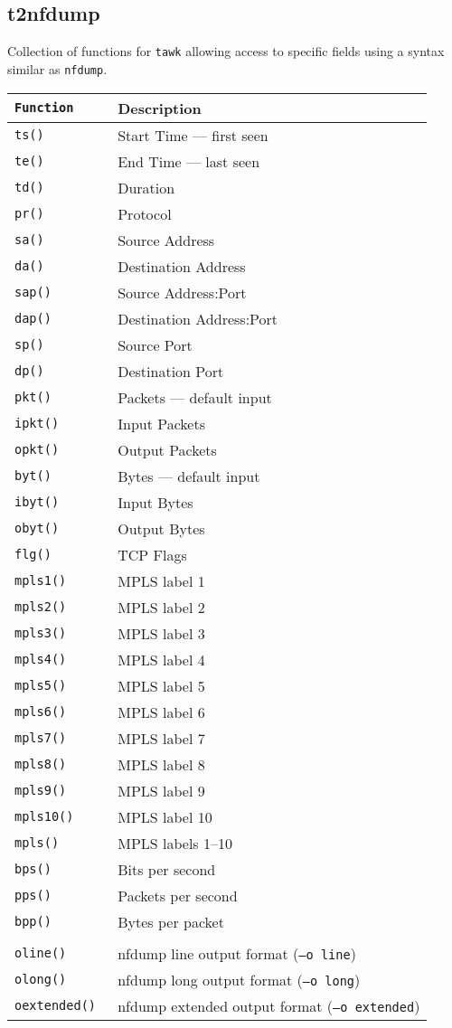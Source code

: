 \documentclass[documentation]{subfiles}
\begin{document}
\subsection{t2nfdump}\label{t2nfdump}
Collection of functions for {\tt tawk} allowing access to specific fields using a syntax similar as {\tt nfdump}.
\begin{longtable}{>{\tt}ll}
    \toprule
    {\bf Function} & {\bf Description}\\
    \midrule\endhead%
    ts()        & Start Time --- first seen\\
    te()        & End Time --- last seen\\
    td()        & Duration\\
    pr()        & Protocol\\
    sa()        & Source Address\\
    da()        & Destination Address\\
    sap()       & Source Address:Port\\
    dap()       & Destination Address:Port\\
    sp()        & Source Port\\
    dp()        & Destination Port\\
    pkt()       & Packets --- default input\\
    ipkt()      & Input Packets\\
    opkt()      & Output Packets\\
    byt()       & Bytes --- default input\\
    ibyt()      & Input Bytes\\
    obyt()      & Output Bytes\\
    flg()       & TCP Flags\\
    mpls1()     & MPLS label 1\\
    mpls2()     & MPLS label 2\\
    mpls3()     & MPLS label 3\\
    mpls4()     & MPLS label 4\\
    mpls5()     & MPLS label 5\\
    mpls6()     & MPLS label 6\\
    mpls7()     & MPLS label 7\\
    mpls8()     & MPLS label 8\\
    mpls9()     & MPLS label 9\\
    mpls10()    & MPLS label 10\\
    mpls()      & MPLS labels 1--10\\
    bps()       & Bits per second\\
    pps()       & Packets per second\\
    bpp()       & Bytes per packet\\
    \\
    oline()     & nfdump line output format ({\tt --o line})\\
    olong()     & nfdump long output format ({\tt --o long})\\
    oextended() & nfdump extended output format ({\tt --o extended})\\
    \bottomrule
\end{longtable}
\end{document}
